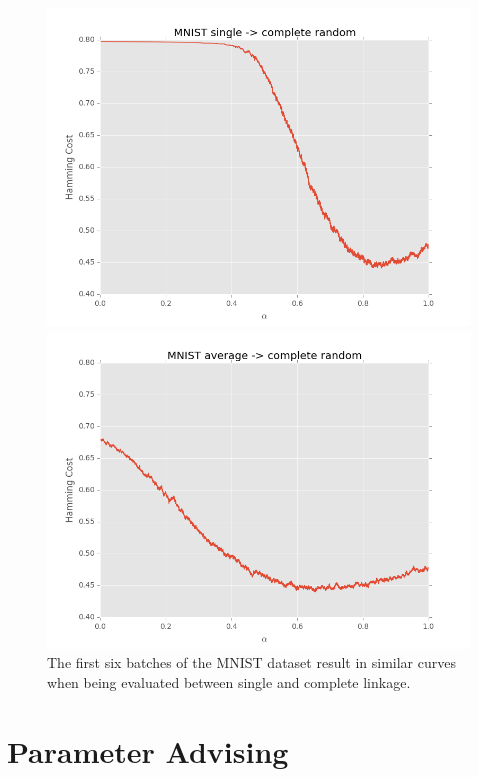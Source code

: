 \begin{figure}[h]
\centering
\begin{minipage}{.45\textwidth}
  \centering
  \includegraphics[width=\linewidth]{images/mnist-sc-random}
\end{minipage}
\begin{minipage}{.45\textwidth}
  \centering
  \includegraphics[width=\linewidth]{images/mnist-ac-random}
\end{minipage}
\caption{The first six batches of the MNIST dataset result in similar curves when being evaluated between single and complete linkage.}
\label{fig:mnist1000sc}
\end{figure}

\section{Parameter Advising}

